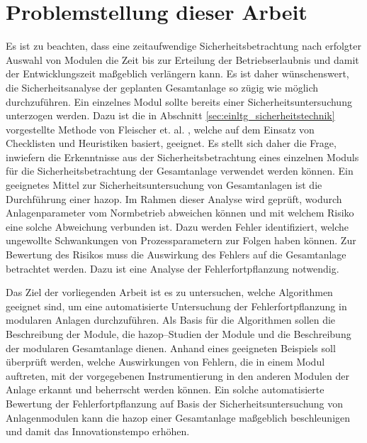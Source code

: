 \section{Problemstellung dieser Arbeit}\label{sec:einltg_aufgabe}

Es ist zu beachten, dass eine zeitaufwendige Sicherheitsbetrachtung nach erfolgter Auswahl von Modulen die Zeit bis zur Erteilung der Betriebserlaubnis und damit der Entwicklungszeit ma\ss{}geblich verl\"angern kann. Es ist daher w\"unschenswert, die Sicherheitsanalyse der geplanten Gesamtanlage so z\"ugig wie m\"oglich durchzuf\"uhren. \linebreak
Ein einzelnes Modul sollte bereits einer Sicherheitsuntersuchung unterzogen werden. Dazu ist die in Abschnitt \ref{sec:einltg_sicherheitstechnik} vorgestellte Methode von Fleischer et. al. , welche auf dem Einsatz von Checklisten und Heuristiken basiert, geeignet.  Es stellt sich daher die Frage, inwiefern die Erkenntnisse aus der Sicherheitsbetrachtung eines einzelnen Moduls f\"ur die Sicherheitsbetrachtung der Gesamtanlage verwendet werden k\"onnen. \linebreak
Ein geeignetes Mittel zur Sicherheitsuntersuchung von Gesamtanlagen ist die Durchf\"uhrung einer \ac{hazop}. Im Rahmen dieser Analyse wird gepr\"uft, wodurch Anlagenparameter vom Normbetrieb abweichen k\"onnen und mit welchem Risiko eine solche Abweichung verbunden ist. Dazu werden Fehler identifiziert, welche ungewollte Schwankungen von Prozessparametern zur Folgen haben k\"onnen. Zur Bewertung des Risikos muss die Auswirkung des Fehlers auf die Gesamtanlage betrachtet werden. Dazu ist eine Analyse der Fehlerfortpflanzung notwendig. 

Das Ziel der vorliegenden Arbeit ist es zu untersuchen, welche Algorithmen geeignet sind, um eine automatisierte Untersuchung der Fehlerfortpflanzung in modularen Anlagen durchzuf\"uhren. Als Basis f\"ur die Algorithmen sollen die Beschreibung der Module, die \ac{hazop}--Studien der Module und die Beschreibung der modularen Gesamtanlage dienen. \linebreak
Anhand eines geeigneten Beispiels soll \"uberpr\"uft werden, welche Auswirkungen von Fehlern, die in einem Modul auftreten, mit der vorgegebenen Instrumentierung in den anderen Modulen der Anlage erkannt und beherrscht werden k\"onnen. \linebreak
Ein solche automatisierte Bewertung der Fehlerfortpflanzung auf Basis der Sicherheitsuntersuchung von Anlagenmodulen kann die \ac{hazop} einer Gesamtanlage ma\ss{}geblich beschleunigen und damit das Innovationstempo erh\"ohen.